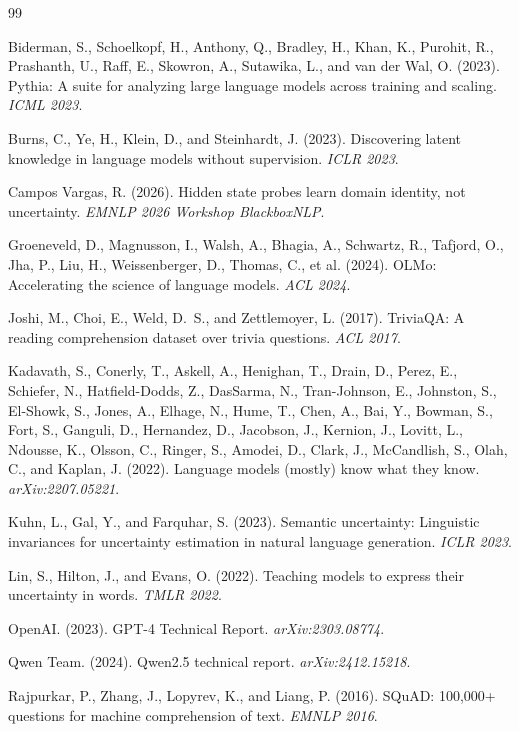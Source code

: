 \documentclass[11pt]{article}
\begin{document}
\begin{thebibliography}{99}

Biderman, S., Schoelkopf, H., Anthony, Q., Bradley, H., Khan, K., Purohit, R., Prashanth, U., Raff, E., Skowron, A., Sutawika, L., and van der Wal, O. (2023).
Pythia: A suite for analyzing large language models across training and scaling.
\textit{ICML 2023}.

Burns, C., Ye, H., Klein, D., and Steinhardt, J. (2023).
Discovering latent knowledge in language models without supervision.
\textit{ICLR 2023}.

Campos Vargas, R. (2026).
Hidden state probes learn domain identity, not uncertainty.
\textit{EMNLP 2026 Workshop BlackboxNLP}.

Groeneveld, D., Magnusson, I., Walsh, A., Bhagia, A., Schwartz, R., Tafjord, O., Jha, P., Liu, H., Weissenberger, D., Thomas, C., et al. (2024).
OLMo: Accelerating the science of language models.
\textit{ACL 2024}.

Joshi, M., Choi, E., Weld, D.~S., and Zettlemoyer, L. (2017).
TriviaQA: A reading comprehension dataset over trivia questions.
\textit{ACL 2017}.

Kadavath, S., Conerly, T., Askell, A., Henighan, T., Drain, D., Perez, E., Schiefer, N., Hatfield-Dodds, Z., DasSarma, N., Tran-Johnson, E., Johnston, S., El-Showk, S., Jones, A., Elhage, N., Hume, T., Chen, A., Bai, Y., Bowman, S., Fort, S., Ganguli, D., Hernandez, D., Jacobson, J., Kernion, J., Lovitt, L., Ndousse, K., Olsson, C., Ringer, S., Amodei, D., Clark, J., McCandlish, S., Olah, C., and Kaplan, J. (2022).
Language models (mostly) know what they know.
\textit{arXiv:2207.05221}.

Kuhn, L., Gal, Y., and Farquhar, S. (2023).
Semantic uncertainty: Linguistic invariances for uncertainty estimation in natural language generation.
\textit{ICLR 2023}.

Lin, S., Hilton, J., and Evans, O. (2022).
Teaching models to express their uncertainty in words.
\textit{TMLR 2022}.

OpenAI. (2023).
GPT-4 Technical Report.
\textit{arXiv:2303.08774}.

Qwen Team. (2024).
Qwen2.5 technical report.
\textit{arXiv:2412.15218}.

Rajpurkar, P., Zhang, J., Lopyrev, K., and Liang, P. (2016).
SQuAD: 100,000+ questions for machine comprehension of text.
\textit{EMNLP 2016}.


\end{thebibliography}
\end{document}
